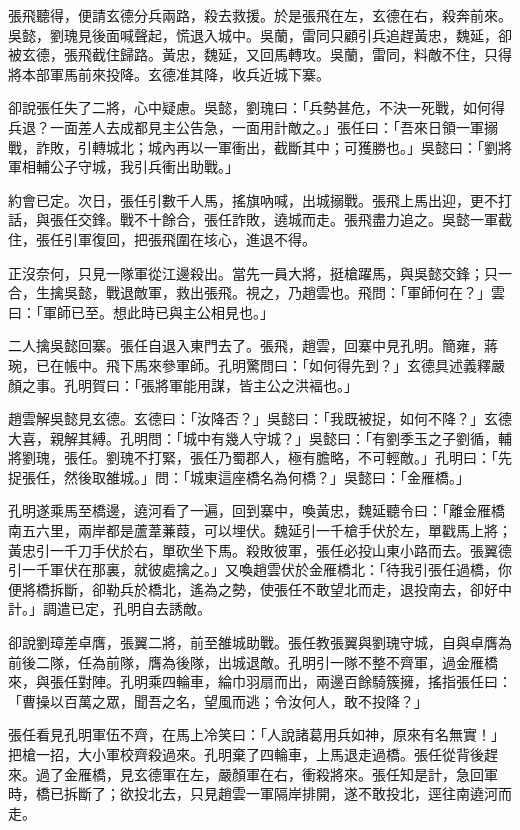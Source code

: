 張飛聽得，便請玄德分兵兩路，殺去救援。於是張飛在左，玄德在右，殺奔前來。吳懿，劉瑰見後面喊聲起，慌退入城中。吳蘭，雷同只顧引兵追趕黃忠，魏延，卻被玄德，張飛截住歸路。黃忠，魏延，又回馬轉攻。吳蘭，雷同，料敵不住，只得將本部軍馬前來投降。玄德准其降，收兵近城下寨。

卻說張任失了二將，心中疑慮。吳懿，劉瑰曰：「兵勢甚危，不決一死戰，如何得兵退？一面差人去成都見主公告急，一面用計敵之。」張任曰：「吾來日領一軍搦戰，詐敗，引轉城北；城內再以一軍衝出，截斷其中；可獲勝也。」吳懿曰：「劉將軍相輔公子守城，我引兵衝出助戰。」

約會已定。次日，張任引數千人馬，搖旗吶喊，出城搦戰。張飛上馬出迎，更不打話，與張任交鋒。戰不十餘合，張任詐敗，遶城而走。張飛盡力追之。吳懿一軍截住，張任引軍復回，把張飛圍在垓心，進退不得。

正沒奈何，只見一隊軍從江邊殺出。當先一員大將，挺槍躍馬，與吳懿交鋒；只一合，生擒吳懿，戰退敵軍，救出張飛。視之，乃趙雲也。飛問：「軍師何在？」雲曰：「軍師已至。想此時已與主公相見也。」

二人擒吳懿回寨。張任自退入東門去了。張飛，趙雲，回寨中見孔明。簡雍，蔣琬，已在帳中。飛下馬來參軍師。孔明驚問曰：「如何得先到？」玄德具述義釋嚴顏之事。孔明賀曰：「張將軍能用謀，皆主公之洪褔也。」

趙雲解吳懿見玄德。玄德曰：「汝降否？」吳懿曰：「我既被捉，如何不降？」玄德大喜，親解其縛。孔明問：「城中有幾人守城？」吳懿曰：「有劉季玉之子劉循，輔將劉瑰，張任。劉瑰不打緊，張任乃蜀郡人，極有膽略，不可輕敵。」孔明曰：「先捉張任，然後取雒城。」問：「城東這座橋名為何橋？」吳懿曰：「金雁橋。」

孔明遂乘馬至橋邊，遶河看了一遍，回到寨中，喚黃忠，魏延聽令曰：「離金雁橋南五六里，兩岸都是蘆葦蒹葭，可以埋伏。魏延引一千槍手伏於左，單戳馬上將；黃忠引一千刀手伏於右，單砍坐下馬。殺敗彼軍，張任必投山東小路而去。張翼德引一千軍伏在那裏，就彼處擒之。」又喚趙雲伏於金雁橋北：「待我引張任過橋，你便將橋拆斷，卻勒兵於橋北，遙為之勢，使張任不敢望北而走，退投南去，卻好中計。」調遣已定，孔明自去誘敵。

卻說劉璋差卓膺，張翼二將，前至雒城助戰。張任教張翼與劉瑰守城，自與卓膺為前後二隊，任為前隊，膺為後隊，出城退敵。孔明引一隊不整不齊軍，過金雁橋來，與張任對陣。孔明乘四輪車，綸巾羽扇而出，兩邊百餘騎簇擁，搖指張任曰：「曹操以百萬之眾，聞吾之名，望風而逃；令汝何人，敢不投降？」

張任看見孔明軍伍不齊，在馬上冷笑曰：「人說諸葛用兵如神，原來有名無實！」把槍一招，大小軍校齊殺過來。孔明棄了四輪車，上馬退走過橋。張任從背後趕來。過了金雁橋，見玄德軍在左，嚴顏軍在右，衝殺將來。張任知是計，急回軍時，橋已拆斷了；欲投北去，只見趙雲一軍隔岸排開，遂不敢投北，逕往南遶河而走。

